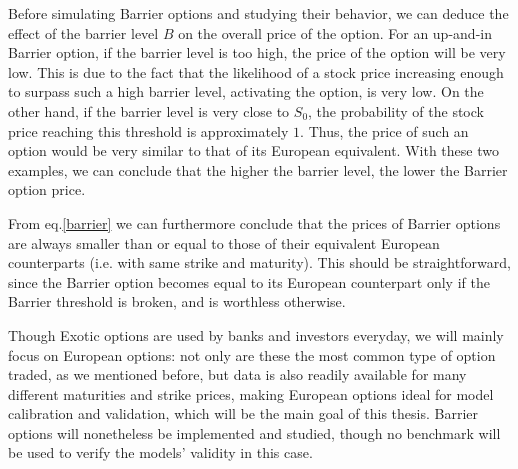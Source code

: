 Before simulating Barrier options and studying their behavior, we can deduce the effect of the barrier level $B$ on the overall price of the option. For an up-and-in Barrier option, if the barrier level is too high, the price of the option will be very low. This is due to the fact that the likelihood of a stock price increasing enough to surpass such a high barrier level, activating the option, is very low. On the other hand, if the barrier level is very close to $S_0$, the probability of the stock price reaching this threshold is approximately $1$. Thus, the price of such an option would be very similar to that of its European equivalent.
With these two examples, we can conclude that the higher the barrier level, the lower the Barrier option price.

From eq.\eqref{barrier} we can furthermore conclude that the prices of Barrier options are always smaller than or equal to those of their equivalent European counterparts (i.e. with same strike and maturity). This should be straightforward, since the Barrier option becomes equal to its European counterpart only if the Barrier threshold is broken, and is worthless otherwise.




Though Exotic options are used by banks and investors everyday, we will mainly focus on European options: not only are these the most common type of option traded, as we mentioned before, but data is also readily available for many different maturities and strike prices, making European options ideal for model calibration and validation, which will be the main goal of this thesis.
Barrier options will nonetheless be implemented and studied, though no benchmark will be used to verify the models' validity in this case.


